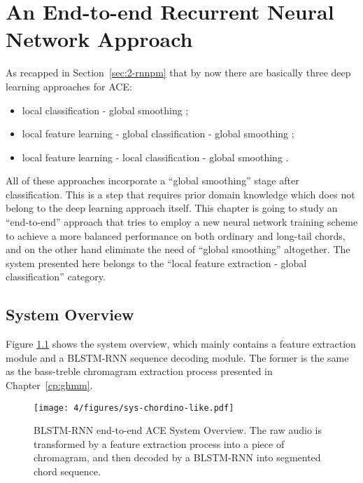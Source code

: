 
\chapter{An End-to-end Recurrent Neural Network Approach}\label{cp:endtoend} %


As recapped in Section~\ref{sec:2-rnnpm} that by now there are basically three deep learning approaches for ACE:
\begin{itemize}
\item local classification - global smoothing \cite{humphrey2012rethinking};
\item local feature learning - global classification - global smoothing \cite{boulanger2013audio,sigtia2015audio};
\item local feature learning - local classification - global smoothing \cite{zhou2015chord}.
\end{itemize}
All of these approaches incorporate a ``global smoothing'' stage after classification. This is a step that requires prior domain knowledge which does not belong to the deep learning approach itself. This chapter is going to study an ``end-to-end'' approach that tries to employ a new neural network training scheme to achieve a more balanced performance on both ordinary and long-tail chords, and on the other hand eliminate the need of ``global smoothing'' altogether. The system presented here belongs to the ``local feature extraction - global classification'' category.


\section{System Overview}\label{sec:4-sysover}
Figure \ref{fig:4-sysover} shows the system overview, which mainly contains a feature extraction module and a BLSTM-RNN sequence decoding module. The former is the same as the bass-treble chromagram extraction process presented in Chapter~\ref{cp:ghmm}.

\begin{figure}[htb]
\centering
\texttt{[image: 4/figures/sys-chordino-like.pdf]}
\caption{BLSTM-RNN end-to-end ACE System Overview. The raw audio is transformed by a feature extraction process into a piece of chromagram, and then decoded by a BLSTM-RNN into segmented chord sequence.}
\label{fig:4-sysover}
\end{figure}

